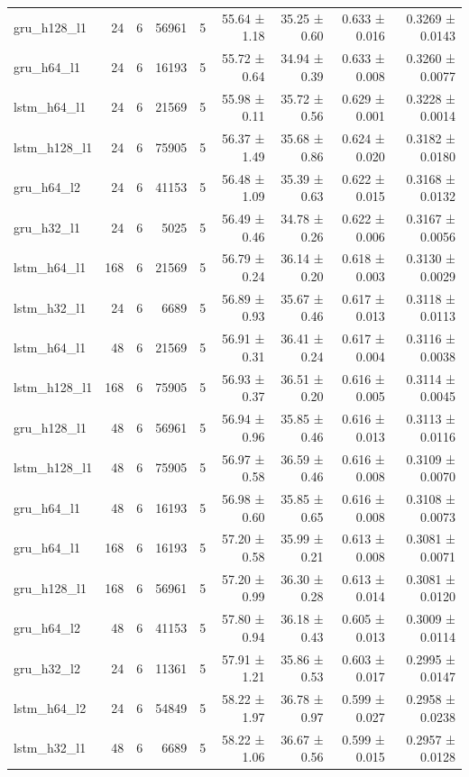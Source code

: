 \begin{table}[htbp]
\begin{tabular}{lrrrrrrrr}
gru\_h128\_l1 & 24 & 6 & 56961 & 5 & 55.64 ± 1.18 & 35.25 ± 0.60 & 0.633 ± 0.016 & 0.3269 ± 0.0143 \\
gru\_h64\_l1 & 24 & 6 & 16193 & 5 & 55.72 ± 0.64 & 34.94 ± 0.39 & 0.633 ± 0.008 & 0.3260 ± 0.0077 \\
lstm\_h64\_l1 & 24 & 6 & 21569 & 5 & 55.98 ± 0.11 & 35.72 ± 0.56 & 0.629 ± 0.001 & 0.3228 ± 0.0014 \\
lstm\_h128\_l1 & 24 & 6 & 75905 & 5 & 56.37 ± 1.49 & 35.68 ± 0.86 & 0.624 ± 0.020 & 0.3182 ± 0.0180 \\
gru\_h64\_l2 & 24 & 6 & 41153 & 5 & 56.48 ± 1.09 & 35.39 ± 0.63 & 0.622 ± 0.015 & 0.3168 ± 0.0132 \\
gru\_h32\_l1 & 24 & 6 & 5025 & 5 & 56.49 ± 0.46 & 34.78 ± 0.26 & 0.622 ± 0.006 & 0.3167 ± 0.0056 \\
lstm\_h64\_l1 & 168 & 6 & 21569 & 5 & 56.79 ± 0.24 & 36.14 ± 0.20 & 0.618 ± 0.003 & 0.3130 ± 0.0029 \\
lstm\_h32\_l1 & 24 & 6 & 6689 & 5 & 56.89 ± 0.93 & 35.67 ± 0.46 & 0.617 ± 0.013 & 0.3118 ± 0.0113 \\
lstm\_h64\_l1 & 48 & 6 & 21569 & 5 & 56.91 ± 0.31 & 36.41 ± 0.24 & 0.617 ± 0.004 & 0.3116 ± 0.0038 \\
lstm\_h128\_l1 & 168 & 6 & 75905 & 5 & 56.93 ± 0.37 & 36.51 ± 0.20 & 0.616 ± 0.005 & 0.3114 ± 0.0045 \\
gru\_h128\_l1 & 48 & 6 & 56961 & 5 & 56.94 ± 0.96 & 35.85 ± 0.46 & 0.616 ± 0.013 & 0.3113 ± 0.0116 \\
lstm\_h128\_l1 & 48 & 6 & 75905 & 5 & 56.97 ± 0.58 & 36.59 ± 0.46 & 0.616 ± 0.008 & 0.3109 ± 0.0070 \\
gru\_h64\_l1 & 48 & 6 & 16193 & 5 & 56.98 ± 0.60 & 35.85 ± 0.65 & 0.616 ± 0.008 & 0.3108 ± 0.0073 \\
gru\_h64\_l1 & 168 & 6 & 16193 & 5 & 57.20 ± 0.58 & 35.99 ± 0.21 & 0.613 ± 0.008 & 0.3081 ± 0.0071 \\
gru\_h128\_l1 & 168 & 6 & 56961 & 5 & 57.20 ± 0.99 & 36.30 ± 0.28 & 0.613 ± 0.014 & 0.3081 ± 0.0120 \\
gru\_h64\_l2 & 48 & 6 & 41153 & 5 & 57.80 ± 0.94 & 36.18 ± 0.43 & 0.605 ± 0.013 & 0.3009 ± 0.0114 \\
gru\_h32\_l2 & 24 & 6 & 11361 & 5 & 57.91 ± 1.21 & 35.86 ± 0.53 & 0.603 ± 0.017 & 0.2995 ± 0.0147 \\
lstm\_h64\_l2 & 24 & 6 & 54849 & 5 & 58.22 ± 1.97 & 36.78 ± 0.97 & 0.599 ± 0.027 & 0.2958 ± 0.0238 \\
lstm\_h32\_l1 & 48 & 6 & 6689 & 5 & 58.22 ± 1.06 & 36.67 ± 0.56 & 0.599 ± 0.015 & 0.2957 ± 0.0128 \\

\end{tabular}
\end{table}
